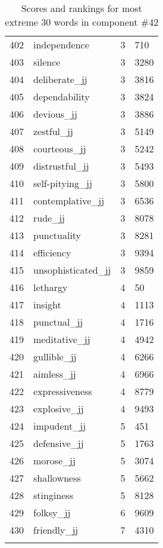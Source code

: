 \begin{longtable}[!htbp]{| rlr@{.}l |}
    402 & independence & 3 & 710 \\
    403 & silence & 3 & 3280 \\
    404 & deliberate\_jj & 3 & 3816 \\
    405 & dependability & 3 & 3824 \\
    406 & devious\_jj & 3 & 3886 \\
    407 & zestful\_jj & 3 & 5149 \\
    408 & courteous\_jj & 3 & 5242 \\
    409 & distrustful\_jj & 3 & 5493 \\
    410 & self-pitying\_jj & 3 & 5800 \\
    411 & contemplative\_jj & 3 & 6536 \\
    412 & rude\_jj & 3 & 8078 \\
    413 & punctuality & 3 & 8281 \\
    414 & efficiency & 3 & 9394 \\
    415 & unsophisticated\_jj & 3 & 9859 \\
    416 & lethargy & 4 & 50 \\
    417 & insight & 4 & 1113 \\
    418 & punctual\_jj & 4 & 1716 \\
    419 & meditative\_jj & 4 & 4942 \\
    420 & gullible\_jj & 4 & 6266 \\
    421 & aimless\_jj & 4 & 6966 \\
    422 & expressiveness & 4 & 8779 \\
    423 & explosive\_jj & 4 & 9493 \\
    424 & impudent\_jj & 5 & 451 \\
    425 & defensive\_jj & 5 & 1763 \\
    426 & morose\_jj & 5 & 3074 \\
    427 & shallowness & 5 & 5662 \\
    428 & stinginess & 5 & 8128 \\
    429 & folksy\_jj & 6 & 9609 \\
    430 & friendly\_jj & 7 & 4310 \\
    \hline
    \caption{Scores and rankings for most extreme 30 words in component \#42} \\
\end{longtable}
